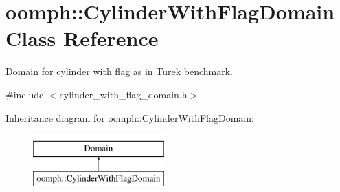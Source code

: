 \hypertarget{classoomph_1_1CylinderWithFlagDomain}{}\section{oomph\+:\+:Cylinder\+With\+Flag\+Domain Class Reference}
\label{classoomph_1_1CylinderWithFlagDomain}


Domain for cylinder with flag as in Turek benchmark.  




{\ttfamily \#include $<$cylinder\+\_\+with\+\_\+flag\+\_\+domain.\+h$>$}

Inheritance diagram for oomph\+:\+:Cylinder\+With\+Flag\+Domain\+:\begin{figure}[H]
\begin{center}
\leavevmode
\includegraphics[height=2.000000cm]{classoomph_1_1CylinderWithFlagDomain}
\end{center}
\end{figure}
